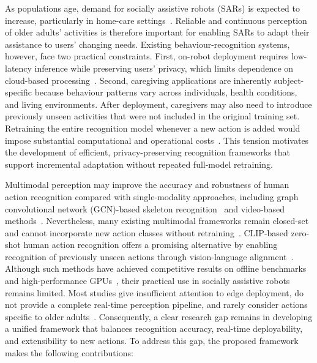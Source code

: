 \documentclass[conference]{IEEEtran}
\begin{document}
As populations age, demand for socially assistive robots (SARs) is expected to increase, particularly in home-care settings~\cite{olatunji2025sar}. Reliable and continuous perception of older adults' activities is therefore important for enabling SARs to adapt their assistance to users' changing needs. Existing behaviour-recognition systems, however, face two practical constraints. First, on-robot deployment requires low-latency inference while preserving users' privacy, which limits dependence on cloud-based processing~\cite{yoon2026edge}. Second, caregiving applications are inherently subject-specific because behaviour patterns vary across individuals, health conditions, and living environments. After deployment, caregivers may also need to introduce previously unseen activities that were not included in the original training set. Retraining the entire recognition model whenever a new action is added would impose substantial computational and operational costs~\cite{park2021classincremental}. This tension motivates the development of efficient, privacy-preserving recognition frameworks that support incremental adaptation without repeated full-model retraining.

Multimodal perception may improve the accuracy and robustness of human action recognition compared with single-modality approaches, including graph convolutional network (GCN)-based skeleton recognition~\cite{yan2018stgcn,shi2019agcn,chen2021ctrgcn} and video-based methods~\cite{carreira2017i3d,wang2016tsn,feichtenhofer2020x3d}. Nevertheless, many existing multimodal frameworks remain closed-set and cannot incorporate new action classes without retraining~\cite{zhang2025rgbdsurvey}. CLIP-based zero-shot human action recognition offers a promising alternative by enabling recognition of previously unseen actions through vision-language alignment~\cite{radford2021clip,wang2021actionclip,ni2022xclip,rasheed2023vificlip}. Although such methods have achieved competitive results on offline benchmarks and high-performance GPUs~\cite{weng2023openvclip}, their practical use in socially assistive robots remains limited. Most studies give insufficient attention to edge deployment, do not provide a complete real-time perception pipeline, and rarely consider actions specific to older adults~\cite{jang2020etri}. Consequently, a clear research gap remains in developing a unified framework that balances recognition accuracy, real-time deployability, and extensibility to new actions.
To address this gap, the proposed framework makes the following contributions:
\end{document}

